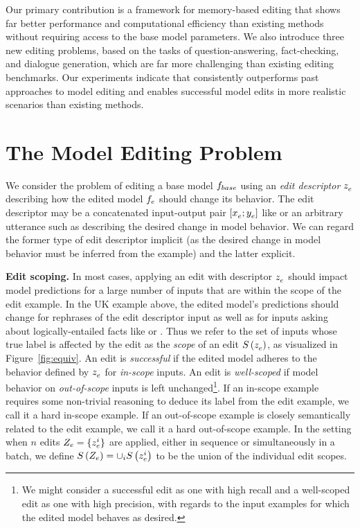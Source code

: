 \documentclass{article}
\begin{document}
Our primary contribution is a framework for memory-based editing that shows far better performance and computational efficiency than existing methods without requiring access to the base model parameters. We also introduce three new editing problems, based on the tasks of question-answering, fact-checking, and dialogue generation, which are far more challenging than existing editing benchmarks. Our experiments indicate that {\name} consistently outperforms past approaches to model editing and enables successful model edits in more realistic scenarios than existing methods.

\section{The Model Editing Problem}


We consider the problem of editing a base model $\basemodel$ using an \textit{edit descriptor} $\ze$ describing how the edited model $\editedmodel$ should change its behavior. The edit descriptor may be a concatenated input-output pair $\editpair$ like  or an arbitrary utterance such as  describing the desired change in model behavior. We can regard the former type of edit descriptor implicit (as the desired change in model behavior must be inferred from the example) and the latter explicit.



\textbf{Edit scoping.} In most cases, applying an edit with descriptor $\ze$ should impact model predictions for a large number of inputs that are within the scope of the edit example. In the UK example above, the edited model's predictions should change for rephrases of the edit descriptor input as well as for inputs asking about logically-entailed facts like  or . Thus we refer to the set of inputs whose true label is affected by the edit as the \textit{scope} of an edit $\scope{\ze}$, as visualized in Figure~\ref{fig:equiv}. An edit is \textit{successful} if the edited model adheres to the behavior defined by $\ze$ for \textit{in-scope} inputs. An edit is \textit{well-scoped} if model behavior on \textit{out-of-scope} inputs is left unchanged\footnote{We might consider a successful edit as one with high recall and a well-scoped edit as one with high precision, with regards to the input examples for which the edited model behaves as desired.}. If an in-scope example requires some non-trivial reasoning to deduce its label from the edit example, we call it a hard in-scope example. If an out-of-scope example is closely semantically related to the edit example, we call it a hard out-of-scope example. In the setting when $n$ edits $\edits = \{\ze[i]\}$ are applied, either in sequence or simultaneously in a batch, we define $\scope{\edits} = \cup_i \scope{\ze[i]}$ to be the union of the individual edit scopes.
\end{document}
